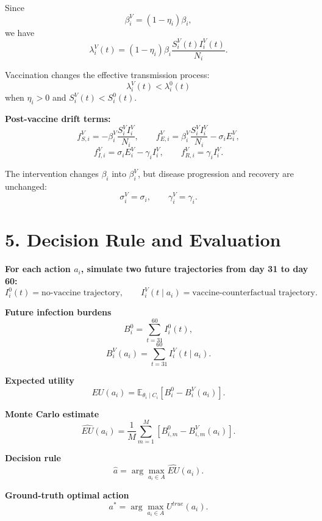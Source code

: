 \documentclass[15pt]{extarticle}
\begin{document}
Since
\[
\beta_i^{V}=(1-\eta_i)\beta_i,
\]
we have
\[
\lambda_i^{V}(t)
=
(1-\eta_i)\beta_i
\frac{S_i^{V}(t)I_i^{V}(t)}{N_i}.
\]

\vspace{0.12cm}

\begin{tcolorbox}
Vaccination changes the effective transmission process:
\[
\lambda_i^{V}(t)
<
\lambda_i^0(t)
\]
when \(\eta_i>0\) and \(S_i^{V}(t)<S_i^0(t)\).
\end{tcolorbox}

\vspace{0.14cm}

\textbf{Post-vaccine drift terms:}
\[
f_{S,i}^{V}= -\beta_i^{V}\frac{S_i^{V}I_i^{V}}{N_i},
\qquad
f_{E,i}^{V}= \beta_i^{V}\frac{S_i^{V}I_i^{V}}{N_i}-\sigma_i E_i^{V},
\]
\[
f_{I,i}^{V}= \sigma_i E_i^{V}-\gamma_i I_i^{V},
\qquad
f_{R,i}^{V}= \gamma_i I_i^{V}.
\]

\begin{tcolorbox}
The intervention changes \(\beta_i\) into \(\beta_i^{V}\), but disease progression and recovery are unchanged:
\[
\sigma_i^{V}=\sigma_i,
\qquad
\gamma_i^{V}=\gamma_i.
\]
\end{tcolorbox}


\newpage
\section*{5. Decision Rule and Evaluation}

\textbf{For each action \(a_i\), simulate two future trajectories from day 31 to day 60:}
\[
I_i^0(t)=\text{no-vaccine trajectory},
\qquad
I_i^V(t\mid a_i)=\text{vaccine-counterfactual trajectory}.
\]

\vspace{0.10cm}

\begin{minipage}[t]{0.47\textwidth}
\textbf{Future infection burdens}
\[
B_i^0=\sum_{t=31}^{60}I_i^0(t),
\]
\[
B_i^V(a_i)=\sum_{t=31}^{60}I_i^V(t\mid a_i).
\]

\textbf{Expected utility}
\[
EU(a_i)=
\mathbb{E}_{\theta_i\mid C_i}
\left[
B_i^0-B_i^V(a_i)
\right].
\]
\end{minipage}
\hfill
\begin{minipage}[t]{0.47\textwidth}
\textbf{Monte Carlo estimate}
\[
\widehat{EU}(a_i)=
\frac{1}{M}
\sum_{m=1}^{M}
\left[
B_{i,m}^0-B_{i,m}^{V}(a_i)
\right].
\]

\textbf{Decision rule}
\[
\hat{a}
=
\arg\max_{a_i\in A}\widehat{EU}(a_i).
\]

\textbf{Ground-truth optimal action}
\[
a^*
=
\arg\max_{a_i\in A}U^{true}(a_i).
\]
\end{minipage}
\end{document}
